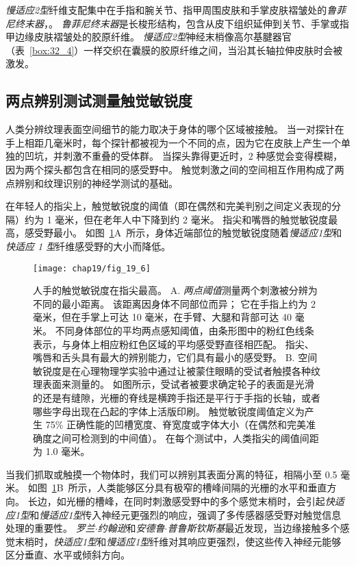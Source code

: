 \textit{慢适应2型}纤维支配集中在手指和腕关节、指甲周围皮肤和手掌皮肤褶皱处的\textit{鲁菲尼终末器}，。
\textit{鲁菲尼终末器}是长梭形结构，包含从皮下组织延伸到关节、手掌或指甲边缘皮肤褶皱处的胶原纤维。
\textit{慢适应2型}神经末梢像高尔基腱器官（表~\ref{box:32_4}）一样交织在囊膜的胶原纤维之间，当沿其长轴拉伸皮肤时会被激发。



\subsection{两点辨别测试测量触觉敏锐度}

人类分辨纹理表面空间细节的能力取决于身体的哪个区域被接触。
当一对探针在手上相距几毫米时，每个探针都被视为一个不同的点，因为它在皮肤上产生一个单独的凹坑，并刺激不重叠的受体群。
当探头靠得更近时，2 种感觉会变得模糊，因为两个探头都包含在相同的感受野中。
触觉刺激之间的空间相互作用构成了两点辨别和纹理识别的神经学测试的基础。


在年轻人的指尖上，触觉敏锐度的阈值（即在偶然和完美判别之间定义表现的分隔）约为 1 毫米，但在老年人中下降到约 2 毫米。
指尖和嘴唇的触觉敏锐度最高，感受野最小。
如图~\ref{fig:19_6}A~所示，身体近端部位的触觉敏锐度随着\textit{慢适应1型}和\textit{快适应 1 型}纤维感受野的大小而降低。


\begin{figure}[htbp]
	\centering
	\texttt{[image: chap19/fig\_19\_6]}
	\caption{人手的触觉敏锐度在指尖最高。
		A. \textit{两点阈值}测量两个刺激被分辨为不同的最小距离。
		该距离因身体不同部位而异；
		它在手指上约为 2 毫米，但在手掌上可达 10 毫米，在手臂、大腿和背部可达 40 毫米。
		不同身体部位的平均两点感知阈值，由条形图中的粉红色线条表示，与身体上相应粉红色区域的平均感受野直径相匹配。
		指尖、嘴唇和舌头具有最大的辨别能力，它们具有最小的感受野\cite{weinstein1968intensive}。
		B. 空间敏锐度是在心理物理学实验中通过让被蒙住眼睛的受试者触摸各种纹理表面来测量的。
		如图所示，受试者被要求确定轮子的表面是光滑的还是有缝隙，光栅的脊线是横跨手指还是平行于手指的长轴，或者哪些字母出现在凸起的字体上活版印刷。
		触觉敏锐度阈值定义为产生 75\% 正确性能的凹槽宽度、脊宽度或字体大小（在偶然和完美准确度之间可检测到的中间值）。
		在每个测试中，人类指尖的阈值间距为 1.0 毫米\cite{johnson1981tactile}。}
	\label{fig:19_6}
\end{figure}


当我们抓取或触摸一个物体时，我们可以辨别其表面分离的特征，相隔小至 0.5 毫米。
如图~\ref{fig:19_6}B~所示，人类能够区分具有极窄的槽峰间隔的光栅的水平和垂直方向。
长边，如光栅的槽峰，在同时刺激感受野中的多个感觉末梢时，会引起\textit{快适应1型}和\textit{慢适应1型}传入神经元更强烈的响应，强调了多传感器感受野对触觉信息处理的重要性。
\textit{罗兰$\cdot$约翰逊}和\textit{安德鲁$\cdot$普鲁斯钦斯基}最近发现，当边缘接触多个感觉末梢时，\textit{快适应1型}和\textit{慢适应1型}纤维对其响应更强烈，使这些传入神经元能够区分垂直、水平或倾斜方向。


